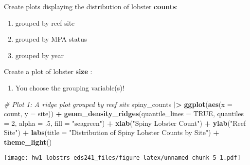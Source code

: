 \documentclass[
]{article}
\newenvironment{Shaded}{\begin{snugshade}}{\end{snugshade}}
\newcommand{\AttributeTok}[1]{\textcolor[rgb]{0.13,0.29,0.53}{#1}}
\newcommand{\CommentTok}[1]{\textcolor[rgb]{0.56,0.35,0.01}{\textit{#1}}}
\newcommand{\ConstantTok}[1]{\textcolor[rgb]{0.56,0.35,0.01}{#1}}
\newcommand{\DecValTok}[1]{\textcolor[rgb]{0.00,0.00,0.81}{#1}}
\newcommand{\FunctionTok}[1]{\textcolor[rgb]{0.13,0.29,0.53}{\textbf{#1}}}
\newcommand{\NormalTok}[1]{#1}
\newcommand{\SpecialCharTok}[1]{\textcolor[rgb]{0.81,0.36,0.00}{\textbf{#1}}}
\newcommand{\StringTok}[1]{\textcolor[rgb]{0.31,0.60,0.02}{#1}}
\providecommand{\tightlist}{%
  \setlength{\itemsep}{0pt}\setlength{\parskip}{0pt}}
\begin{document}
Create plots displaying the distribution of lobster \textbf{counts}:

\begin{enumerate}
\def\labelenumi{\arabic{enumi})}
\tightlist
\item
  grouped by reef site\\
\item
  grouped by MPA status
\item
  grouped by year
\end{enumerate}

Create a plot of lobster \textbf{size} :

\begin{enumerate}
\def\labelenumi{\arabic{enumi})}
\setcounter{enumi}{3}
\tightlist
\item
  You choose the grouping variable(s)!
\end{enumerate}

\begin{Shaded}
\begin{Highlighting}[]
\CommentTok{\# Plot 1: A ridge plot grouped by reef site}
\NormalTok{spiny\_counts }\SpecialCharTok{|\textgreater{}}
\FunctionTok{ggplot}\NormalTok{(}\FunctionTok{aes}\NormalTok{(}\AttributeTok{x =}\NormalTok{ count, }\AttributeTok{y =}\NormalTok{ site)) }\SpecialCharTok{+} 
    \FunctionTok{geom\_density\_ridges}\NormalTok{(}\AttributeTok{quantile\_lines =} \ConstantTok{TRUE}\NormalTok{,}
                        \AttributeTok{quantiles =} \DecValTok{2}\NormalTok{,}
                        \AttributeTok{alpha =}\NormalTok{ .}\DecValTok{5}\NormalTok{,}
                        \AttributeTok{fill =} \StringTok{"seagreen"}\NormalTok{) }\SpecialCharTok{+}
    \FunctionTok{xlab}\NormalTok{(}\StringTok{"Spiny Lobster Count"}\NormalTok{) }\SpecialCharTok{+}
    \FunctionTok{ylab}\NormalTok{(}\StringTok{"Reef Site"}\NormalTok{) }\SpecialCharTok{+}
    \FunctionTok{labs}\NormalTok{(}\AttributeTok{title =} \StringTok{"Distribution of Spiny Lobster Counts by Site"}\NormalTok{) }\SpecialCharTok{+}
    \FunctionTok{theme\_light}\NormalTok{()}
\end{Highlighting}
\end{Shaded}

\texttt{[image: hw1-lobstrs-eds241\_files/figure-latex/unnamed-chunk-5-1.pdf]}
\end{document}

